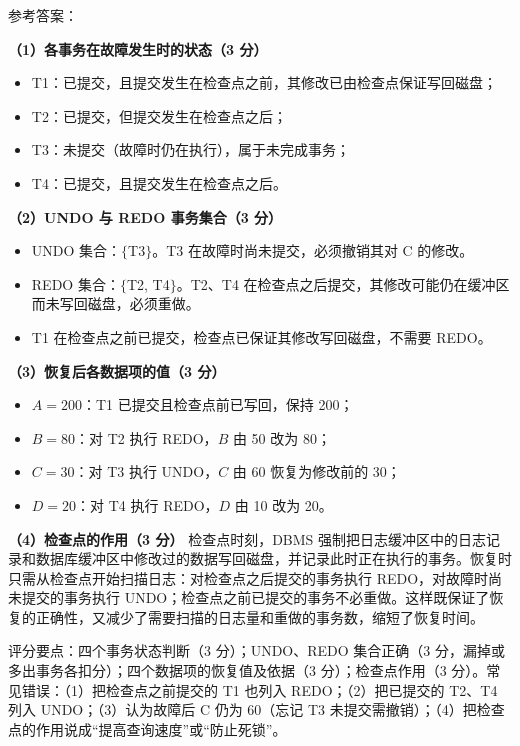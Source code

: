 \documentclass[a4paper,11pt]{article}
\begin{document}
\q 参考答案：

\textbf{（1）各事务在故障发生时的状态（3 分）}
\begin{itemize}[leftmargin=1.6em, itemsep=1pt]
  \item T1：已提交，且提交发生在检查点之前，其修改已由检查点保证写回磁盘；
  \item T2：已提交，但提交发生在检查点之后；
  \item T3：未提交（故障时仍在执行），属于未完成事务；
  \item T4：已提交，且提交发生在检查点之后。
\end{itemize}

\textbf{（2）UNDO 与 REDO 事务集合（3 分）}
\begin{itemize}[leftmargin=1.6em, itemsep=1pt]
  \item UNDO 集合：$\{$T3$\}$。T3 在故障时尚未提交，必须撤销其对 C 的修改。
  \item REDO 集合：$\{$T2, T4$\}$。T2、T4 在检查点之后提交，其修改可能仍在缓冲区而未写回磁盘，必须重做。
  \item T1 在检查点之前已提交，检查点已保证其修改写回磁盘，不需要 REDO。
\end{itemize}

\textbf{（3）恢复后各数据项的值（3 分）}
\begin{itemize}[leftmargin=1.6em, itemsep=1pt]
  \item $A=200$：T1 已提交且检查点前已写回，保持 200；
  \item $B=80$：对 T2 执行 REDO，$B$ 由 50 改为 80；
  \item $C=30$：对 T3 执行 UNDO，$C$ 由 60 恢复为修改前的 30；
  \item $D=20$：对 T4 执行 REDO，$D$ 由 10 改为 20。
\end{itemize}

\textbf{（4）检查点的作用（3 分）}
检查点时刻，DBMS 强制把日志缓冲区中的日志记录和数据库缓冲区中修改过的数据写回磁盘，并记录此时正在执行的事务。恢复时只需从检查点开始扫描日志：对检查点之后提交的事务执行 REDO，对故障时尚未提交的事务执行 UNDO；检查点之前已提交的事务不必重做。这样既保证了恢复的正确性，又减少了需要扫描的日志量和重做的事务数，缩短了恢复时间。
\begin{analysis}评分要点：四个事务状态判断（3 分）；UNDO、REDO 集合正确（3 分，漏掉或多出事务各扣分）；四个数据项的恢复值及依据（3 分）；检查点作用（3 分）。常见错误：（1）把检查点之前提交的 T1 也列入 REDO；（2）把已提交的 T2、T4 列入 UNDO；（3）认为故障后 C 仍为 60（忘记 T3 未提交需撤销）；（4）把检查点的作用说成“提高查询速度”或“防止死锁”。\end{analysis}
\end{document}
